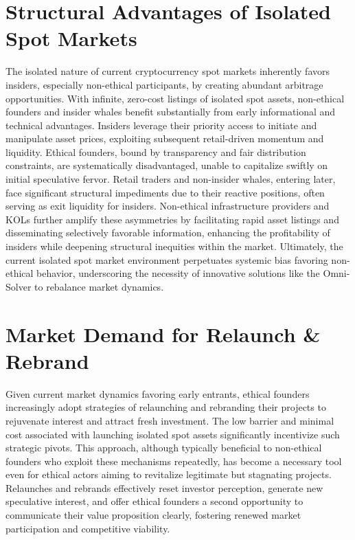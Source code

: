 \documentclass{article}
\begin{document}
\section{Structural Advantages of Isolated Spot Markets}

The isolated nature of current cryptocurrency spot markets inherently favors insiders, especially non-ethical participants, by creating abundant arbitrage opportunities. With infinite, zero-cost listings of isolated spot assets, non-ethical founders and insider whales benefit substantially from early informational and technical advantages. Insiders leverage their priority access to initiate and manipulate asset prices, exploiting subsequent retail-driven momentum and liquidity. Ethical founders, bound by transparency and fair distribution constraints, are systematically disadvantaged, unable to capitalize swiftly on initial speculative fervor. Retail traders and non-insider whales, entering later, face significant structural impediments due to their reactive positions, often serving as exit liquidity for insiders. Non-ethical infrastructure providers and KOLs further amplify these asymmetries by facilitating rapid asset listings and disseminating selectively favorable information, enhancing the profitability of insiders while deepening structural inequities within the market. Ultimately, the current isolated spot market environment perpetuates systemic bias favoring non-ethical behavior, underscoring the necessity of innovative solutions like the Omni-Solver to rebalance market dynamics.

\section{Market Demand for Relaunch & Rebrand}

Given current market dynamics favoring early entrants, ethical founders increasingly adopt strategies of relaunching and rebranding their projects to rejuvenate interest and attract fresh investment. The low barrier and minimal cost associated with launching isolated spot assets significantly incentivize such strategic pivots. This approach, although typically beneficial to non-ethical founders who exploit these mechanisms repeatedly, has become a necessary tool even for ethical actors aiming to revitalize legitimate but stagnating projects. Relaunches and rebrands effectively reset investor perception, generate new speculative interest, and offer ethical founders a second opportunity to communicate their value proposition clearly, fostering renewed market participation and competitive viability.
\end{document}
